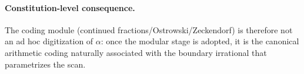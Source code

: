 \paragraph{Constitution-level consequence.}
The coding module (continued fractions/Ostrowski/Zeckendorf) is therefore not an ad hoc digitization of $\alpha$: once the modular stage is adopted, it is the canonical arithmetic coding naturally associated with the boundary irrational that parametrizes the scan.


